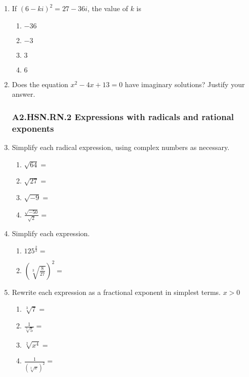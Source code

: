 \documentclass[12pt, twoside]{article}
\begin{document}
\begin{enumerate}[itemsep=0.5cm]
\item If \((6 - ki)^2 = 27 - 36i\), the value of \(k\) is
\begin{enumerate}
    \item \(-36\)
    \item \(-3\)
    \item \(3\)
    \item \(6\)
\end{enumerate} \vspace{2cm}

\item Does the equation $x^2 - 4x + 13 = 0$ have imaginary solutions? Justify your answer.

\newpage
\subsubsection*{A2.HSN.RN.2 Expressions with radicals and rational exponents}
\item Simplify each radical expression, using complex numbers as necessary.
    \begin{multicols}{2}
    \begin{enumerate}[itemsep=0.5cm]
        \item $\sqrt{64}=$
        \item $\sqrt{27}=$
        \item $\sqrt{-9}=$
        \item $\displaystyle \frac{\sqrt{-50}}{\sqrt{2}}=$
    \end{enumerate}
    \end{multicols} \vspace{1cm}
    
\item Simplify each expression.
    \begin{multicols}{2}
    \begin{enumerate}[itemsep=0.5cm]
        \item $\displaystyle 125^{\frac{2}{3}} =$
        \item $\left( \sqrt[3]{\frac{8}{27}} \right)^{2} =$
    \end{enumerate}
    \end{multicols} \vspace{2cm}

    
\item Rewrite each expression as a fractional exponent in simplest terms. $x>0$
    \begin{multicols}{2}
      \begin{enumerate}[itemsep=1cm]
          \item $\sqrt[3]{7} =$
          \item $\displaystyle \frac{1}{\sqrt[3]{5}}=$
          \item $\sqrt[2]{x^4} =$
          \item $\displaystyle \frac{1}{(\sqrt[3]{x})^2}=$
      \end{enumerate}
      \end{multicols} \vspace{1cm}
  

\end{enumerate}
\end{document}
